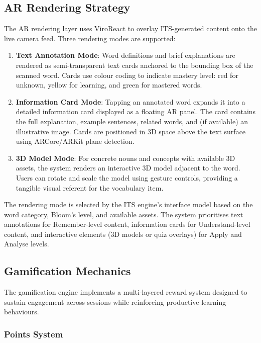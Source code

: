 \subsection{AR Rendering Strategy}
\label{subsec:ar_rendering}

The AR rendering layer uses ViroReact to overlay ITS-generated content onto the live camera feed. Three rendering modes are supported:

\begin{enumerate}
    \item \textbf{Text Annotation Mode}: Word definitions and brief explanations are rendered as semi-transparent text cards anchored to the bounding box of the scanned word. Cards use colour coding to indicate mastery level: red for unknown, yellow for learning, and green for mastered words.

    \item \textbf{Information Card Mode}: Tapping an annotated word expands it into a detailed information card displayed as a floating AR panel. The card contains the full explanation, example sentences, related words, and (if available) an illustrative image. Cards are positioned in 3D space above the text surface using ARCore/ARKit plane detection.

    \item \textbf{3D Model Mode}: For concrete nouns and concepts with available 3D assets, the system renders an interactive 3D model adjacent to the word. Users can rotate and scale the model using gesture controls, providing a tangible visual referent for the vocabulary item.
\end{enumerate}

The rendering mode is selected by the ITS engine's interface model based on the word category, Bloom's level, and available assets. The system prioritises text annotations for Remember-level content, information cards for Understand-level content, and interactive elements (3D models or quiz overlays) for Apply and Analyse levels.

\subsection{Gamification Mechanics}
\label{subsec:gamification_mechanics}

The gamification engine implements a multi-layered reward system designed to sustain engagement across sessions while reinforcing productive learning behaviours.

\subsubsection{Points System}

